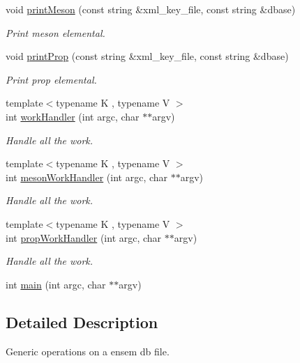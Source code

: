 \begin{DoxyCompactItemize}
void \mbox{\hyperlink{adat-devel_2main_2dbutil_2dbutil_8cc_a562fa6116f55a7f0dbfe8ca08e136460}{print\+Meson}} (const string \&xml\+\_\+key\+\_\+file, const string \&dbase)
\begin{DoxyCompactList}\small\item\em Print meson elemental. \end{DoxyCompactList}\item 
void \mbox{\hyperlink{adat-devel_2main_2dbutil_2dbutil_8cc_a6ff051251360484ce00ee0688f3636b3}{print\+Prop}} (const string \&xml\+\_\+key\+\_\+file, const string \&dbase)
\begin{DoxyCompactList}\small\item\em Print prop elemental. \end{DoxyCompactList}\item 
{\footnotesize template$<$typename K , typename V $>$ }\\int \mbox{\hyperlink{adat-devel_2main_2dbutil_2dbutil_8cc_a115ac046e9c4d74d76cec46ec78c3f9b}{work\+Handler}} (int argc, char $\ast$$\ast$argv)
\begin{DoxyCompactList}\small\item\em Handle all the work. \end{DoxyCompactList}\item 
{\footnotesize template$<$typename K , typename V $>$ }\\int \mbox{\hyperlink{adat-devel_2main_2dbutil_2dbutil_8cc_af8b76d6df0ac8bee6ad6ed5d144b2835}{meson\+Work\+Handler}} (int argc, char $\ast$$\ast$argv)
\begin{DoxyCompactList}\small\item\em Handle all the work. \end{DoxyCompactList}\item 
{\footnotesize template$<$typename K , typename V $>$ }\\int \mbox{\hyperlink{adat-devel_2main_2dbutil_2dbutil_8cc_afa664cbd0d7ec40f584e2f7b9a5f9c37}{prop\+Work\+Handler}} (int argc, char $\ast$$\ast$argv)
\begin{DoxyCompactList}\small\item\em Handle all the work. \end{DoxyCompactList}\item 
int \mbox{\hyperlink{adat-devel_2main_2dbutil_2dbutil_8cc_a3c04138a5bfe5d72780bb7e82a18e627}{main}} (int argc, char $\ast$$\ast$argv)
\end{DoxyCompactItemize}


\subsection{Detailed Description}
Generic operations on a ensem db file. 



